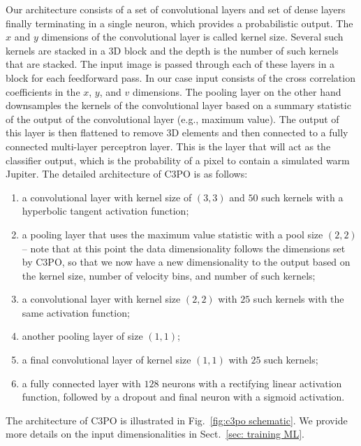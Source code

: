 \documentclass{aa}
\begin{document}
Our architecture consists of a set of convolutional layers and set of dense layers finally terminating in a single neuron, which provides a probabilistic output.
The $x$ and $y$ dimensions of the convolutional layer is called kernel size.
Several such kernels are stacked in a 3D block and the depth is the number of such kernels that are stacked.
The input image is passed through each of these layers in a block for each feedforward pass.
In our case input consists of the cross correlation coefficients in the $x$, $y$, and $v$ dimensions.
The pooling layer on the other hand downsamples the kernels of the convolutional layer based on a summary statistic of the output of the convolutional layer (e.g., maximum value).
The output of this layer is then flattened to remove 3D elements and then connected to a fully connected multi-layer perceptron layer. 
This is the layer that will act as the classifier output, which is the probability of a pixel to contain a simulated warm Jupiter. The detailed architecture of C3PO is as follows:
\begin{enumerate}
    \item a convolutional layer with kernel size of $\left(3,3\right)$ and $50$ such kernels with a hyperbolic tangent activation function;
    \item a pooling layer that uses the maximum value statistic with a pool size $\left(2,2\right)$ -- note that at this point the data dimensionality follows the dimensions set by C3PO, so that we now have a new dimensionality to the output based on the kernel size, number of velocity bins, and number of such kernels;
    \item a convolutional layer with kernel size $\left(2,2\right)$ with $25$ such kernels with the same activation function;
    \item another pooling layer of size $(1,1)$;
    \item a final convolutional layer of kernel size $(1,1)$ with $25$ such kernels;
    \item a fully connected layer with $128$ neurons with a rectifying linear activation function, followed by a dropout and final neuron with a sigmoid activation.
\end{enumerate}
The architecture of C3PO is illustrated in Fig.~\ref{fig:c3po schematic}. We provide more details on the input dimensionalities in Sect.~\ref{sec: training ML}.
\end{document}
